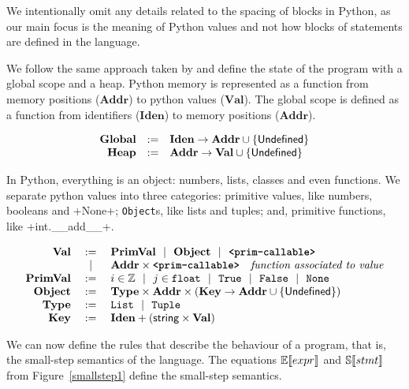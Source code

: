 We intentionally omit any details related to the spacing of blocks in Python, as our main
focus is the meaning of Python values and not how blocks of statements are defined in the
language.

We follow the same approach taken by \autocite{fromherz_static_2018} and define the state
of the program with a global scope and a heap.
Python memory is represented as a function from memory positions ($\mathbf{Addr}$) to
python values ($\mathbf{Val}$). The global scope is defined as a function from identifiers
($\mathbf{Iden}$) to memory positions ($\mathbf{Addr}$).

$$\begin{array}{rcl}
  \mathbf{Global}  &:=& \mathbf{Iden} \to \mathbf{Addr} \cup \{\mathsf{Undefined}\} \\
  \mathbf{Heap}  &:=& \mathbf{Addr} \to \mathbf{Val} \cup \{\mathsf{Undefined}\} \\
\end{array}$$

In Python, everything is an object: numbers, lists, classes and even functions. We separate
python values into three categories: primitive values, like numbers, booleans and
\pycode+None+; \verb+Object+s, like lists and tuples; and, primitive functions, like
\pycode+int.__add__+.

$$\begin{array}{rcl}
  \mathbf{Val} &:=& \mathbf{PrimVal} ~~|~~ \mathbf{Object} ~~|~~ \textbf{\texttt{<prim-callable>}} \\
         &~~|~~& \mathbf{Addr} \times \textbf{\texttt{<prim-callable>}} \quad \textit{function associated to value} \\
  \mathbf{PrimVal} &:=& i \in \mathbb{Z} ~~|~~ j \in \texttt{float} ~~|~~ \texttt{True} ~~|~~ \texttt{False} ~~|~~ \texttt{None} \\
  \mathbf{Object} &:=& \mathbf{Type} \times \mathbf{Addr} \times \left(\mathbf{Key} \to \mathbf{Addr} \cup \{\mathsf{Undefined}\}\right) \\
  \mathbf{Type} &:=& \texttt{List} ~~|~~ \texttt{Tuple} \\
  \mathbf{Key} &:=& \mathbf{Iden} + \left(\textsf{string} \times \mathbf{Val}\right) \\
\end{array}$$

We can now define the rules that describe the behaviour of a program, that is, the
small-step semantics of the language. The equations $\mathbb{E}\!\left\llbracket expr \right\rrbracket$ and $\mathbb{S}\!\left\llbracket stmt \right\rrbracket$
from Figure~\ref{smallstep1} define the small-step semantics.

